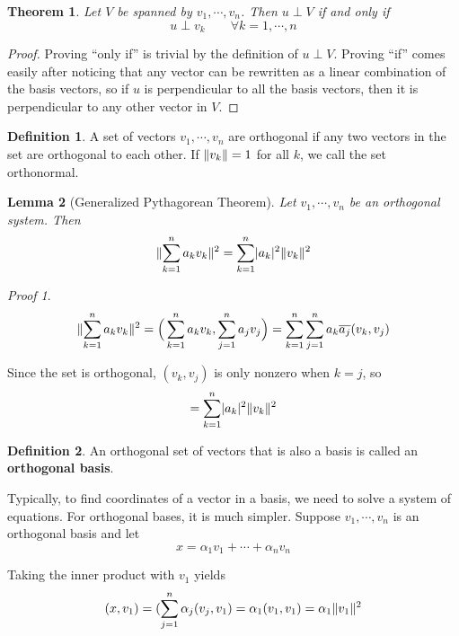 \documentclass[a4paper,10pt]{book}
\DeclarePairedDelimiter\abs{\lvert}{\rvert}
\DeclarePairedDelimiter{\norm}{\lVert}{\rVert}
\theoremstyle{plain}
\newtheorem{theorem}{Theorem}[section]
\theoremstyle{plain}
\newtheorem{lemma}[theorem]{Lemma}
\theoremstyle{remark}
\newtheorem*{lproof}{Proof}
\theoremstyle{definition}
\newtheorem{definition}{Definition}[section]
\begin{document}
\begin{theorem}
Let $V$ be spanned by $v_{1}, \cdots, v_{n}$. Then $u \perp V$ if and only if 
$$u \perp v_{k} \qquad \forall k = 1, \cdots, n$$
\end{theorem}

\begin{proof}
Proving ``only if'' is trivial by the definition of $u \perp V$. Proving ``if'' comes easily after noticing that any vector can be rewritten as a linear combination of the basis vectors, so if $u$ is perpendicular to all the basis vectors, then it is perpendicular to any other vector in $V$. 
\end{proof}

\begin{definition}
A set of vectors $v_{1}, \cdots, v_{n}$ are orthogonal if any two vectors in the set are orthogonal to each other. If $\norm{v_{k}} = 1$ for all $k$, we call the set orthonormal. 
\end{definition}

\begin{lemma}[Generalized Pythagorean Theorem]
Let $v_{1}, \cdots, v_{n}$ be an orthogonal system. Then 
$$\norm{\sum_{k=1}^{n} a_{k} v_{k}}^{2} = \sum_{k=1}^{n} \abs{a_{k}}^{2} \norm{v_{k}}^{2}$$
\end{lemma}

\begin{lproof}
$$\norm{\sum_{k=1}^{n} a_{k} v_{k}}^{2} = \Big( \sum_{k=1}^{n} a_{k} v_{k}, \sum_{j=1}^{n} a_{j} v_{j} \Big) = \sum_{k=1}^{n} \sum_{j=1}^{n} a_{k} \overline{a_{j}} (v_{k}, v_{j})$$

Since the set is orthogonal, $(v_{k}, v_{j})$ is only nonzero when $k = j$, so 
$$= \sum_{k=1}^{n} \abs{a_{k}}^{2} \norm{v_{k}}^{2}$$
\end{lproof}

\begin{definition}
An orthogonal set of vectors that is also a basis is called an \textbf{orthogonal basis}. 
\end{definition}

Typically, to find coordinates of a vector in a basis, we need to solve a system of equations. For orthogonal bases, it is much simpler. Suppose $v_{1}, \cdots, v_{n}$ is an orthogonal basis and let 
$$x = \alpha_{1} v_{1} + \cdots + \alpha_{n} v_{n}$$

Taking the inner product with $v_{1}$ yields 
$$(x, v_{1}) = (\sum_{j=1}^{n} \alpha_{j} (v_{j}, v_{1}) = \alpha_{1} (v_{1}, v_{1}) = \alpha_{1} \norm{v_{1}}^{2}$$
\end{document}
